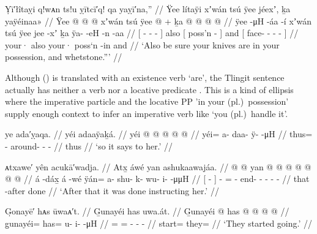 \ex\label{ex:92-95-your-knife-and-whetstone}%
%
\begingl
	\glpreamble	Ỵī′łîtaỵi q!wᴀn ts!u ỵītcī′q! qa yaỵī′na,” //
	\glpreamble	Ÿee lítaÿi xʼwán tsú ÿee jéexʼ, ḵa yaÿéinaa\!» //
	\gla	{} Ÿee  @ {} @ {} @ {} {}	xʼwán tsú
		{} ÿee  @ {} {} +
		ḵa {}  @ {} @ {} @ {} @ {} {} //
	\glb	{} ÿee  -μH -áa -í {} xʼwán tsú
		{} ÿee jee -xʼ {}
		ḵa {} ÿa-  -eH -n -aa {} //
	\glc	{}[   - - - {}]
			 also
		{}[  poss’n - {}]
		and
		{}[ face-  - - - {}] //
	\gld	{} your·  {} {} {} {}  also
		{} your· poss‘n -in {}
		and {}  {} {} {} {} {} //
	\glft	‘Also be sure your knives are in your possession, and whetstone.”’
		//
\endgl
\xe

Although (\lastx) is translated with an existence verb ‘are’, the Tlingit sentence actually has neither a verb nor a locative predicate .
This is a kind of ellipsis where the imperative particle  and the locative PP  ’in your (pl.)\ possession’ supply enough context to infer an imperative verb like  ‘you (pl.)\ handle it’.

\ex\label{ex:92-96-says-to-her}%
%
\begingl
	\glpreamble	ye ada′ỵaqa. //
	\glpreamble	yéi adaaÿaḵá. //
	\gla	yéi @  @ {} @ {} @ {} @ {} //
	\glb	yéi= a- daa- ÿ-  -μH //
	\glc	thus= - around- -  - //
	\gld	thus  {} {} {} {} //
	\glft	‘so it says to her.’
		//
\endgl
\xe

\ex\label{ex:92-97-done-instructing}%
%
\begingl
	\glpreamble	ᴀtxawe′ yên acukā′wadja. //
	\glpreamble	Atx̱ áwé yan ashukaawajáa. //
	\gla	{}  @ {} {}  @ {}
		yan @  @ {} @ {} @ {} @ {} @ {} @ {} //
	\glb	{} á -dáx̱ {} á -wé
		ÿán= a- shu- k- wu- i-  -μμH //
	\glc	{}[  - {}]  -
		= - end- - - -
			 - //
	\gld	{} that -after {}  {}
		done  {} {} {} {} {} {} //
	\glft	‘After that it was done instructing her.’
		//
\endgl
\xe

\ex\label{ex:92-98-started-going}%
%
\begingl
	\glpreamble	G̣onayē′ hᴀs ūwaᴀ′t. //
	\glpreamble	G̱unayéi has uwa.át. //
	\gla	G̱unayéi @ has @  @ {} @ {} @ {} //
	\glb	g̱unayéi= has= u- i-  -μH //
	\glc	{}= = - -  - //
	\gld	start= they=  {} {} {} //
	\glft	‘They started going.’
		//
\endgl
\xe

